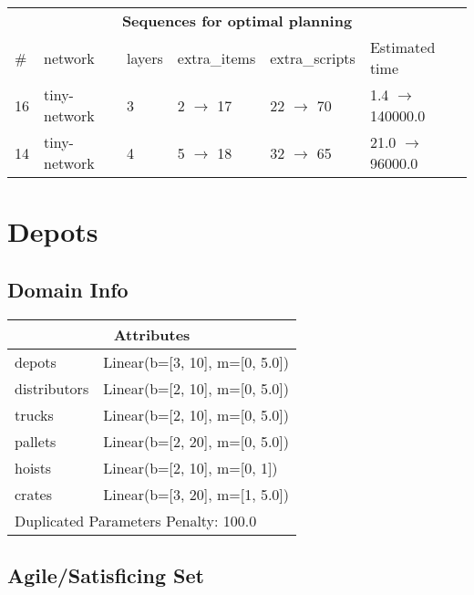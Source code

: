 \documentclass{article}
\begin{document}
                            \begin{center}
                            \begin{tabular}{l|l|l|l|l|l}
                            \multicolumn{6}{c}{\bf \large Sequences for optimal planning}\\
                            \# & network & layers & extra\_items & extra\_scripts & Estimated time\\\midrule
                            16&tiny-network&3&2 $\rightarrow$ 17&22 $\rightarrow$ 70&1.4 $\rightarrow$ 140000.0\\
14&tiny-network&4&5 $\rightarrow$ 18&32 $\rightarrow$ 65&21.0 $\rightarrow$ 96000.0
                            \end{tabular}
                            \end{center}
                    \newpage \section{Depots}
                    \subsection*{Domain Info}

                    \begin{center}
                    \begin{tabular}{p{}p{}}
                    \multicolumn{2}{c}{\bf \large Attributes}\\\midrule
                    depots & Linear(b=[3, 10], m=[0, 5.0])\\
distributors & Linear(b=[2, 10], m=[0, 5.0])\\
trucks & Linear(b=[2, 10], m=[0, 5.0])\\
pallets & Linear(b=[2, 20], m=[0, 5.0])\\
hoists & Linear(b=[2, 10], m=[0, 1])\\
crates & Linear(b=[3, 20], m=[1, 5.0])
                    
                     \\\midrule
                    \multicolumn{2}{l}{Duplicated Parameters Penalty: 100.0}
                    \end{tabular}
                    \end{center}
                
                         \subsection*{Agile/Satisficing Set}
\end{document}

